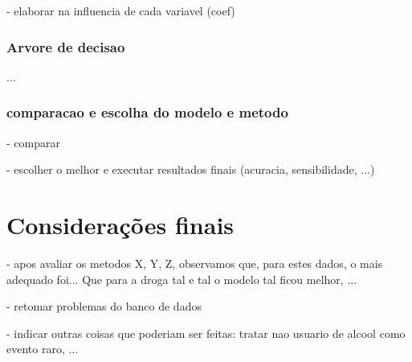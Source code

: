 \documentclass[
	article,			%
	11pt,				%
	oneside,			%
	a4paper,			%
	english,			%
	brazil,				%
	sumario=tradicional
	]{abntex2}
\begin{document}
- elaborar na influencia de cada variavel (coef)


\subsubsection{Arvore de decisao}
... 

\subsubsection{comparacao e escolha do modelo e metodo}

- comparar

- escolher o melhor e executar resultados finais (acuracia, sensibilidade, ...)

% 

\section*{Considerações finais}


- apos avaliar os metodos X, Y, Z, observamos que, para estes dados, o mais adequado foi... Que para a droga tal e tal o modelo tal ficou melhor, ...

- retomar problemas do banco de dados

- indicar outras coisas que poderiam ser feitas: tratar nao usuario de alcool como evento raro, ...



%
%

%
%
%

%
%
\end{document}
